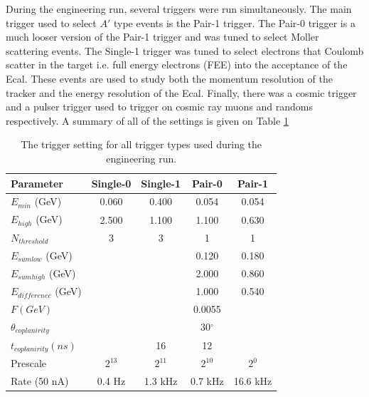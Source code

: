 During the engineering run, several triggers were run simultaneously.  The main
trigger used to select $A'$ type events is the Pair-1 trigger.  The Pair-0 
trigger is a much looser version of the Pair-1 trigger and was tuned to select 
Moller scattering events.  The Single-1 trigger was tuned to select electrons
that Coulomb scatter in the target i.e. full energy electrons (FEE) into the 
acceptance of the Ecal.  These events are used to study both the momentum 
resolution of the tracker and the energy resolution of the Ecal.  Finally, 
there was a cosmic trigger and a pulser trigger used to trigger on cosmic ray
muons and randoms respectively.  A summary of all of the settings is given
on Table \ref{tab:triggers}

\begin{table}
    \centering
    \begin{tabular}{lcccc}
        \toprule
        \textbf{Parameter} & \textbf{Single-0} & \textbf{Single-1} & \textbf{Pair-0} & \textbf{Pair-1} \\
        \midrule
        \midrule
        $E_{min}$ (GeV)      & 0.060 & 0.400 & 0.054 & 0.054 \\
        $E_{high}$ (GeV)     & 2.500 & 1.100 & 1.100 & 0.630 \\
        $N_{threshold}$      & 3     & 3     & 1     & 1     \\
        $E_{sum low}$ (GeV)  &       &       & 0.120 & 0.180 \\
        $E_{sum high}$ (GeV) &       &       & 2.000 & 0.860 \\
        $E_{differenec}$ (GeV) &       &       & 1.000 & 0.540 \\
        $F (GeV)$ & & & 0.0055 \\
        $\theta_{coplanirity}$ & & & 30$^\circ$ \\
        $t_{coplanirity} (ns)$ & & 16 & 12 \\
        Prescale & $2^{13}$ & $2^{11}$ & $2^{10}$ & $2^{0}$ \\
        Rate (50 nA) & 0.4 Hz & 1.3 kHz & 0.7 kHz & 16.6 kHz \\
        \bottomrule
    \end{tabular}
    \caption{The trigger setting for all trigger types used during the 
             engineering run.}
    \label{tab:triggers}
\end{table}




